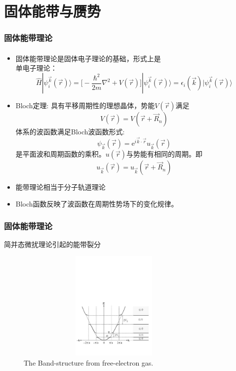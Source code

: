 \documentclass[cjk,slidestop,compress,mathserif,blue]{beamer}
\newcommand{\upcite}[1]{\hspace{0ex}\textsuperscript{\cite{#1}}} %
\begin{document}
\section{固体能带与赝势}       %
\frame
{
\frametitle{固体能带理论}
\begin{itemize}%
   \setlength{\itemsep}{8pt}
   \item 固体能带理论\upcite{Huang_Han}是固体电子理论的基础，形式上是\\单电子理论：
    $$\hat H |\psi_i^{\vec k}(\vec r)\rangle=\bigg[-\dfrac{\hbar^2}{2m}\nabla^2+V(\vec r)\bigg]|\psi_i^{\vec k}(\vec r)\rangle=\epsilon_i(\vec k)|\psi_i^{\vec k}(\vec r)\rangle$$
  \item \textrm{Bloch}定理:
具有平移周期性的理想晶体，势能$V(\vec r)$满足$$V(\vec r)=V(\vec r+\vec R_n)$$
体系的波函数满足\textrm{Bloch}波函数形式:$$\psi_{\vec k}(\vec r)=\textrm{e}^{i\vec k\cdot\vec r}u_{\vec k}(\vec r)$$
是平面波和周期函数的乘积。$u(\vec r)$与势能有相同的周期。即$$u_{\vec k}(\vec r)=u_{\vec k}(\vec r+\vec R_n)$$
  \item 能带理论相当于分子轨道理论
\item \textrm{Bloch}函数反映了波函数在周期性势场下的变化规律。
\end{itemize}
}

\frame
{
\frametitle{固体能带理论}
简并态微扰理论引起的能带裂分
\begin{figure}[h!]
\centering
\includegraphics[height=2.1in,width=3.8in,viewport=10 90 570 380,clip]{Figures/Band_Gap.pdf}
\caption{\small \textrm{The Band-structure from free-electron gas.}}%
\label{Band-Structure-1}
\end{figure} 
}
\end{document}
